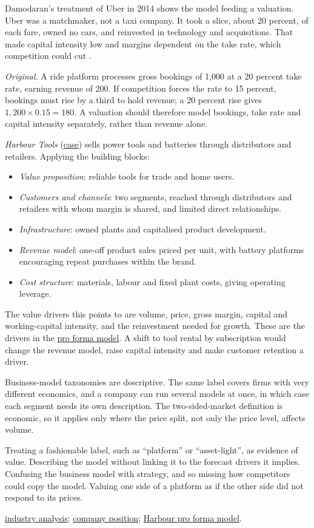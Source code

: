 \begin{qfdefinition}
Damodaran's treatment of Uber in 2014 shows the model feeding a valuation. Uber was a matchmaker, not a taxi company. It took a slice, about 20 percent, of each fare, owned no cars, and reinvested in technology and acquisitions. That made capital intensity low and margins dependent on the take rate, which competition could cut \citep[pp.~83--85]{narrative-and-numbers-2017}.

 \emph{Original.} A ride platform processes gross bookings of 1,000 at a 20 percent take rate, earning revenue of 200. If competition forces the rate to 15 percent, bookings must rise by a third to hold revenue; a 20 percent rise gives $1{,}200\times0.15=180$. A valuation should therefore model bookings, take rate and capital intensity separately, rather than revenue alone.

\emph{Harbour Tools} (\hyperref[ex:harbour-tools-statements]{case}) sells power tools and batteries through distributors and retailers. Applying the building blocks:
\begin{itemize}
\item \emph{Value proposition}: reliable tools for trade and home users.
\item \emph{Customers and channels}: two segments, reached through distributors and retailers with whom margin is shared, and limited direct relationships.
\item \emph{Infrastructure}: owned plants and capitalised product development.
\item \emph{Revenue model}: one-off product sales priced per unit, with battery platforms encouraging repeat purchases within the brand.
\item \emph{Cost structure}: materials, labour and fixed plant costs, giving operating leverage.
\end{itemize}
The value drivers this points to are volume, price, gross margin, capital and working-capital intensity, and the reinvestment needed for growth. These are the drivers in the \hyperref[ex:harbour-pro-forma-model]{pro forma model}. A shift to tool rental by subscription would change the revenue model, raise capital intensity and make customer retention a driver.

 Business-model taxonomies are descriptive. The same label covers firms with very different economics, and a company can run several models at once, in which case each segment needs its own description. The two-sided-market definition is economic, so it applies only where the price split, not only the price level, affects volume.

 Treating a fashionable label, such as ``platform'' or ``asset-light'', as evidence of value. Describing the model without linking it to the forecast drivers it implies. Confusing the business model with strategy, and so missing how competitors could copy the model. Valuing one side of a platform as if the other side did not respond to its prices.

 \hyperref[meth:industry-analysis]{industry analysis}; \hyperref[meth:company-position-analysis]{company position}; \hyperref[ex:harbour-pro-forma-model]{Harbour pro forma model}.

\end{qfdefinition}
